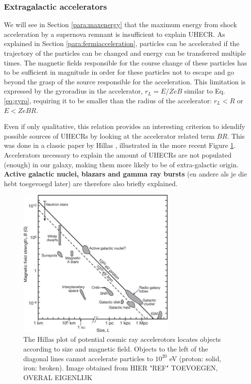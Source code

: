 \subsubsection{Extragalactic accelerators}
We will see in Section \ref{para:maxenergy} that the maximum energy from shock acceleration by a supernova remnant is insufficient to explain UHECR. As explained in Section \ref{para:fermiacceleration}, particles can be accelerated if the trajectory of the particles can be changed and energy can be transferred multiple times. The magnetic fields responsible for the course change of these particles has to be sufficient in magnitude in order for these particles not to escape and go beyond the grasp of the source responsible for the acceleration. This limitation is expressed by the gyroradius in the accelerator, $r_L = E/ZeB$ similar to Eq. \ref{eq:gyro}, requiring it to be smaller than the radius of the accelerator: $r_L < R$ or $E < ZeBR$.

Even if only qualitative, this relation provides an interesting criterion to idendify possible sources of UHECRs by looking at the accelerator related term $BR$. This was done in a classic paper by Hillas \cite{Hillas:1985is}, illustrated in the more recent Figure \ref{fig:hillas}. Accelerators necessary to explain the amount of UHECRs are not populated (enough) in our galaxy, making them more likely to be of extra-galactic origin. \textbf{Active galactic nuclei, blazars and gamma ray bursts} (en andere als je die hebt toegevoegd later) are therefore also briefly explained.

\begin{figure}
\centering
\includegraphics[width = 0.7\textwidth]{chapter3/img/Hillas.jpg}
\caption{The Hillas plot of potential cosmic ray accelerotors locates objects according to size and magnetic field. Objects to the left of the diagonal lines cannot accelerate particles to $10^{20}$ eV (proton: solid, iron: broken). Image obtained from HIER "REF" TOEVOEGEN, OVERAL EIGENLIJK \cite{Bauleo:2009zz}}
\label{fig:hillas}
\end{figure}




